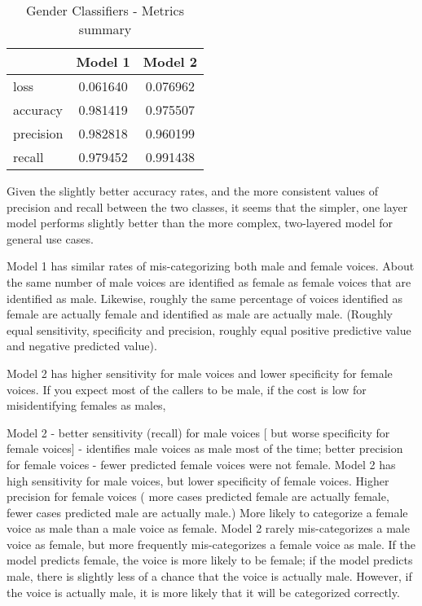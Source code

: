 \documentclass[11pt, letterpaper]{article}
\begin{document}
\begin{table}[h]
\begin{center}
\caption{Gender Classifiers - Metrics summary}
\begin{tabular}{l c c}
& 	Model 1 & Model 2 \\ \hline
loss	&0.061640 & 0.076962 \\
accuracy& 0.981419 & 0.975507 \\
precision & 0.982818 & 0.960199 \\
recall & 0.979452 & 0.991438 \\
\end{tabular}
\label{tab:GenMetricsSum}
\end{center}
\end{table} 

Given the slightly better accuracy rates, and the more consistent values of precision and recall between the two classes, it seems that the simpler, one layer model performs slightly better than the more complex, two-layered model for general use cases.



Model 1 has similar rates of mis-categorizing both male and female voices. About the same number of male voices are identified as female as female voices that are identified as male. Likewise, roughly the same percentage of voices identified as female are actually female and identified as male are actually male. (Roughly equal sensitivity, specificity and precision, roughly equal positive predictive value and negative predicted value).

Model 2 has higher sensitivity for male voices and lower specificity for female voices.
If you expect most of the callers to be male, if the cost is low for misidentifying females as males,

Model 2 - better sensitivity (recall) for male voices [ but worse specificity for female voices] - identifies male voices as male most of the time; better precision for female voices - fewer predicted female voices were not female. 
Model 2 has high sensitivity  for male voices, but lower specificity of female voices.  Higher precision for female voices ( more cases predicted female are actually female, fewer cases predicted male are actually male.) More likely to categorize a female voice as male than a male voice as female.
Model 2 rarely mis-categorizes a male voice as female, but more frequently mis-categorizes a female voice as male. If the model predicts female, the voice is more likely to be female; if the model predicts male, there is slightly less of a chance that the voice is actually male. However, if the voice is actually male, it is more likely that it will be categorized correctly. %
\end{document}
